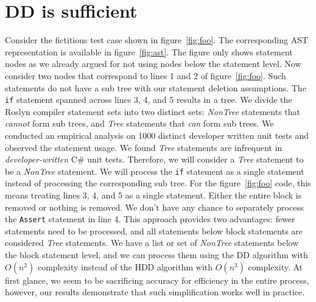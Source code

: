 \section{DD is sufficient}
Consider the fictitious test case shown in figure~\ref{fig:foo}. The corresponding AST representation is available in figure~\ref{fig:ast}. The figure only shows statement nodes as we already argued for not using nodes below the statement level. Now consider two nodes that correspond to lines 1 and 2 of figure~\ref{fig:foo}. Such statements do not have a sub tree with our statement deletion assumptions. The \texttt{if} statement spanned across lines 3, 4, and 5 results in a tree. We divide the Roslyn compiler statement sets into two distinct sets: \emph{NonTree} statements that \emph{cannot} form sub trees, and \emph{Tree} statements that \emph{can} form sub trees. We conducted an empirical analysis on 1000 distinct developer written unit tests and observed the statement usage. We found \emph{Tree} statements are infrequent in \emph{developer-written} C\# unit tests. Therefore, we will consider a \emph{Tree} statement to be a \emph{NonTree} statement. We will process the \texttt{if} statement as a single statement instead of processing the corresponding sub tree. For the figure~\ref{fig:foo} code, this means treating lines 3, 4, and 5 as a single statement. Either the entire block is removed or nothing is removed. We don't have any chance to separately process the \texttt{Assert} statement in line 4. This approach provides two advantages: fewer statements need to be processed, and all statements below block statements are considered \emph{Tree} statements. We have a list or set of  \emph{NonTree} statements below the block statement level, and we can process them using the DD algorithm with $O(n^2)$ complexity instead of the HDD algorithm with $O(n^3)$ complexity. At first glance, we seem to be sacrificing accuracy for efficiency in the entire process, however, our results demonstrate that such simplification works well in practice. 
